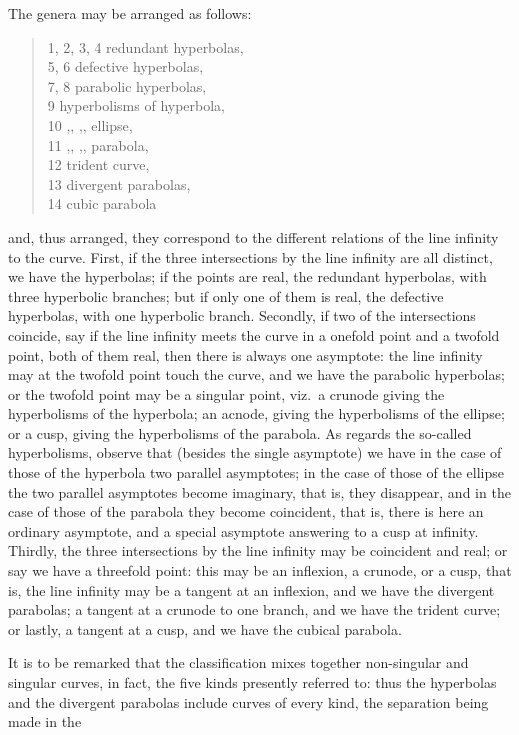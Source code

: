 \documentclass[12pt,a4paper,oneside]{book}
\begin{document}
The genera may be arranged as follows:
\begin{quote}
1, 2, 3, 4 redundant hyperbolas,\\
5, 6 defective hyperbolas,\\
7, 8 parabolic hyperbolas,\\
9 hyperbolisms of hyperbola,\\
10 \quad ,, \qquad ,, \quad ellipse,\\
11 \quad ,, \qquad ,, \quad parabola,\\
12 trident curve,\\
13 divergent parabolas,\\
14 cubic parabola
\end{quote}
and, thus arranged, they correspond to the different relations of the line infinity to the curve. First, if the three intersections by the line infinity are all distinct, we have the hyperbolas; if the points are real, the redundant hyperbolas, with three hyperbolic branches; but if only one of them is real, the defective hyperbolas, with one hyperbolic branch. Secondly, if two of the intersections coincide, say if the line infinity meets the curve in a onefold point and a twofold point, both of them real, then there is always one asymptote: the line infinity may at the twofold point touch the curve, and we have the parabolic hyperbolas; or the twofold point may be a singular point, viz.\ a crunode giving the hyperbolisms of the hyperbola; an acnode, giving the hyperbolisms of the ellipse; or a cusp, giving the hyperbolisms of the parabola. As regards the so-called hyperbolisms, observe that (besides the single asymptote) we have in the case of those of the hyperbola two parallel asymptotes; in the case of those of the ellipse the two parallel asymptotes become imaginary, that is, they disappear, and in the case of those of the parabola they become coincident, that is, there is here an ordinary asymptote, and a special asymptote answering to a cusp at infinity. Thirdly, the three intersections by the line infinity may be coincident and real; or say we have a threefold point: this may be an inflexion, a crunode, or a cusp, that is, the line infinity may be a tangent at an inflexion, and we have the divergent parabolas; a tangent at a crunode to one branch, and we have the trident curve; or lastly, a tangent at a cusp, and we have the cubical parabola.

It is to be remarked that the classification mixes together non-singular and singular curves, in fact, the five kinds presently referred to: thus the hyperbolas and the divergent parabolas include curves of every kind, the separation being made in the
\end{document}
